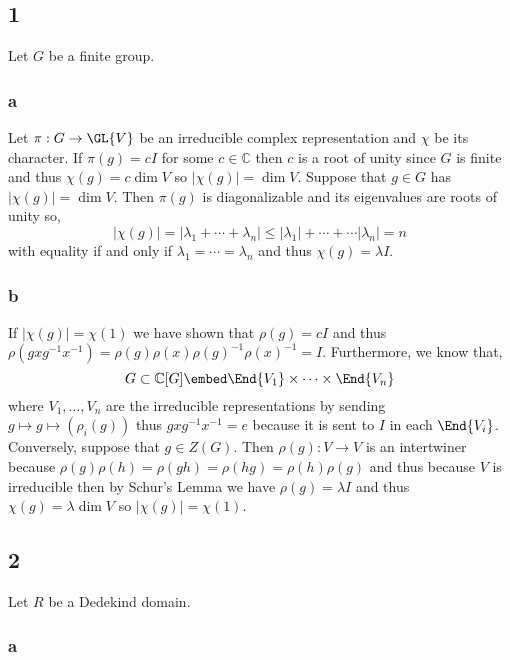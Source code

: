 \documentclass[12pt]{article}
\renewcommand{\C}{\mathbb{C}}
\begin{document}
\subsection{1}

Let $G$ be a finite group.

\subsubsection{a}

Let $\pi : G \to \GL{V}$ be an irreducible complex representation and $\chi$ be its character. If $\pi(g) = c I$ for some $c \in \C$ then $c$ is a root of unity since $G$ is finite and thus $\chi(g) = c \dim{V}$ so $|\chi(g)| = \dim{V}$. Suppose that $g \in G$ has $|\chi(g)| = \dim{V}$. Then $\pi(g)$ is diagonalizable and its eigenvalues are roots of unity so,
\[ |\chi(g)| = |\lambda_1 + \cdots + \lambda_n| \le |\lambda_1| + \cdots + \cdots |\lambda_n| = n \]
with equality if and only if $\lambda_1 = \cdots = \lambda_n$ and thus $\chi(g) = \lambda I$.

\subsubsection{b}

If $|\chi(g)| = \chi(1)$ we have shown that $\rho(g) = c I$ and thus $\rho(g x g^{-1}x^{-1}) = \rho(g) \rho(x) \rho(g)^{-1} \rho(x)^{-1} = I$. Furthermore, we know that,
\[ G \subset \C[G] \embed \End{V_1} \times \cdots \times \End{V_n} \]
where $V_1, \dots, V_n$ are the irreducible representations by sending $g \mapsto g \mapsto (\rho_i(g))$ thus $g x g^{-1} x^{-1} = e$ because it is sent to $I$ in each $\End{V_i}$.
\bigskip\\
Conversely, suppose that $g \in Z(G)$. Then $\rho(g) : V \to V$ is an intertwiner because $\rho(g) \rho(h) = \rho(gh) = \rho(hg) = \rho(h) \rho(g)$ and thus because $V$ is irreducible then by Schur's Lemma we have $\rho(g) = \lambda I$ and thus $\chi(g) = \lambda \dim{V}$ so $|\chi(g)| = \chi(1)$.

\subsection{2}

Let $R$ be a Dedekind domain.

\subsubsection{a}
\end{document}
